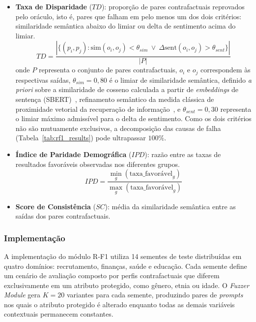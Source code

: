 \begin{itemize}
    \item \textbf{Taxa de Disparidade} ($TD$): proporção de pares contrafactuais reprovados pelo oráculo, isto é, pares que falham em pelo menos um dos dois critérios: similaridade semântica abaixo do limiar ou delta de sentimento acima do limiar.
    \begin{equation}
    TD = \frac{|\{(p_i, p_j) : \text{sim}(o_i, o_j) < \theta_{sim}\ \lor\ \Delta\text{sent}(o_i, o_j) > \theta_{sent}\}|}{|P|}
    \end{equation}
    onde $P$ representa o conjunto de pares contrafactuais, $o_i$ e $o_j$ correspondem às respectivas saídas, $\theta_{sim} = 0{,}80$ é o limiar de similaridade semântica, definido \textit{a priori} sobre a similaridade de cosseno calculada a partir de \textit{embeddings} de sentença (SBERT)~\cite{Reimers2019}, refinamento semântico da medida clássica de proximidade vetorial da recuperação de informação~\cite{Singhal2001}, e $\theta_{sent} = 0{,}30$ representa o limiar máximo admissível para o delta de sentimento. Como os dois critérios não são mutuamente exclusivos, a decomposição das causas de falha (Tabela~\ref{tab:rf1_results}) pode ultrapassar $100\%$.

    \item \textbf{Índice de Paridade Demográfica} ($IPD$): razão entre as taxas de resultados favoráveis observadas nos diferentes grupos.
    \begin{equation}
    IPD = \frac{\min_g(\text{taxa\_favorável}_g)}{\max_g(\text{taxa\_favorável}_g)}
    \end{equation}

    \item \textbf{Score de Consistência} ($SC$): média da similaridade semântica entre as saídas dos pares contrafactuais.
\end{itemize}

\subsubsection{Implementação}

A implementação do módulo R-F1 utiliza 14 sementes de teste distribuídas em quatro domínios: recrutamento, finanças, saúde e educação. Cada semente define um cenário de avaliação composto por perfis contrafactuais que diferem exclusivamente em um atributo protegido, como gênero, etnia ou idade. O \textit{Fuzzer Module} gera $K=20$ variantes para cada semente, produzindo pares de \textit{prompts} nos quais o atributo protegido é alterado enquanto todas as demais variáveis contextuais permanecem constantes.

